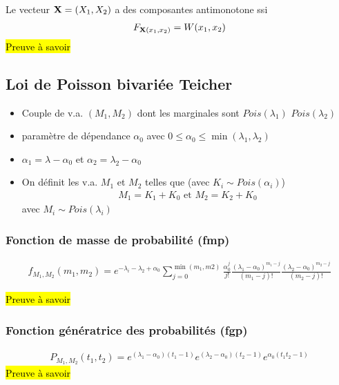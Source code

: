 \documentclass[10pt, french]{article}
\begin{document}
\begin{multicols*}{2}
\begin{definition}
Le vecteur $\mathbf{X} = (X_1, X_2)$ a des composantes antimonotone ssi
\begin{align*}
F_{\mathbf{X}(x_1,x_2)} = W(x_1, x_2)
\end{align*}
\hl{Preuve à savoir}
\end{definition}

\subsection{Loi de Poisson bivariée Teicher}
\begin{itemize}
\item Couple de v.a. $(M_1, M_2)$ dont les marginales sont $Pois(\lambda_1)$ $Pois(\lambda_2)$
\item paramètre de dépendance $\alpha_0$ avec $0 \leq \alpha_0 \leq \min(\lambda_1, \lambda_2)$
\item $\alpha_1 = \lambda - \alpha_0$ et $\alpha_2 = \lambda_2 - \alpha_0$
\item On définit les v.a. $M_1$ et $M_2$ telles que (avec $K_i \sim Pois(\alpha_i)$)
\begin{align*}
M_1 = K_1 + K_0 \text{ et } M_2 = K_2 + K_0
\end{align*}
avec $M_i \sim Pois(\lambda_i)$
\end{itemize}

\subsubsection{Fonction de masse de probabilité (fmp)}

\begin{align*}
f_{M_1, M_2}(m_1, m_2) = e^{-\lambda_i - \lambda_2 + \alpha_0} \sum_{j=0}^{\min(m_1, m2)} \frac{\alpha_0^{j}}{j!} \frac{(\lambda_1 - \alpha_0)^{m_1 - j}}{(m_1 - j)!} \frac{(\lambda_2 - \alpha_0)^{m_2 - j}}{(m_2 - j)!}
\end{align*}



\hl{Preuve à savoir}

\subsubsection{Fonction génératrice des probabilités (fgp)}
\begin{align*}
P_{M_1, M_2}(t_1, t_2) = e^{(\lambda_1 - \alpha_0)(t_1 -1)} e^{(\lambda_2 - \alpha_0)(t_2 - 1)} e^{\alpha_0(t_1 t_2 - 1)}
\end{align*}
\hl{Preuve à savoir}


\end{multicols*}
\end{document}
